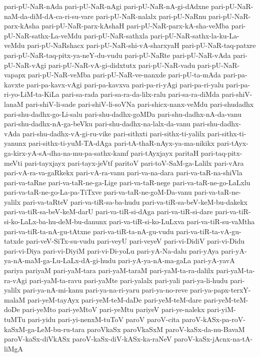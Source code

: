 {pari-pU-NaR-nAda
pari-pU-NaR-nAgi
pari-pU-NaR-nA-gi-dAdxne
pari-pU-NaR-naM-da-diM-dA-ca-ri-su-vare
pari-pU-NaR-nalalx
pari-pU-NaRnu
pari-pU-NaR-parx-kAsha
pari-pU-NaR-parx-kAshaH
pari-pU-NaR-parx-kA-sha-veMba
pari-pU-NaR-sathx-La-veMdu
pari-pU-NaR-sathxla
pari-pU-NaR-sathx-la-ku-La-veMdu
pari-pU-NaRshacx
pari-pU-NaR-shi-vA-sharxyaH
pari-pU-NaR-taq-patxre
pari-pU-NaR-taq-pitx-ya-neY-du-vudu
pari-pU-NaRte
pari-pU-NaR-vAda
pari-pU-NaR-vAgi
pari-pU-NaR-vA-gi-didxtutx
pari-pU-NaR-vadu
pari-pU-NaR-vapapx
pari-pU-NaR-veMba
pari-pU-NaR-ve-nanxde
pari-pU-ta-mAda
pari-pa-kavxte
pari-pa-kavx-vAgi
pari-pa-kavxva
pari-pa-ri-yAgi
pari-pa-ri-yalu
pari-pa-ri-yo-LiM-ta-KiLa
pari-sa-rada
pari-sa-ra-da-lilx-ralu
pari-sa-ra-diMda
pari-shiV-lanaM
pari-shiV-li-sade
pari-shiV-li-soVNa
pari-shicx-nanx-veMdu
pari-shudadhx
pari-shu-dadhx-go-Li-salu
pari-shu-dadhx-goMDa
pari-shu-dadhx-nA-da-vanu
pari-shu-dadhx-nA-ga-beVku
pari-shu-dadhx-na-lalx-da-vanu
pari-shu-dadhx-vAda
pari-shu-dadhx-vA-gi-ru-vike
pari-sithxti
pari-sithx-ti-yalilx
pari-sithx-ti-yanunx
pari-sithx-ti-yuM-TA-dAga
pari-tA-thaR-nAyx-ya-ma-nikikx
pari-tAyx-ga-kirx-yA-sA-dha-na-mu-pa-sathx-kamf
pari-tAyxjayx
paritaH
pari-taq-pitx-meVti
pari-tayxjayx
pari-tayx-jeVtf
paritoV
pari-toV-SaM-ga-Lalilx
pari-vAra
pari-vA-ra-va-gaRkekx
pari-vA-ra-vanu
pari-va-na-dara
pari-va-taR-na-shiVla
pari-va-taRne
pari-va-taR-ne-ga-Lige
pari-va-taR-nege
pari-va-taR-ne-go-LaLxlu
pari-va-taR-ne-go-La-pa-TiTxve
pari-va-taR-ne-goM-Da-vanu
pari-va-taR-ne-yalilx
pari-va-taRteV
pari-va-tiR-sa-ba-hudu
pari-va-tiR-sa-beV-keM-bu-dakekx
pari-va-tiR-sa-beV-keM-darU
pari-va-tiR-si-dAga
pari-va-tiR-si-dare
pari-va-tiR-si-ko-LaLx-ba-hu-deM-bu-danunx
pari-va-tiR-si-ko-LuLxva
pari-va-tiR-su-vaMtha
pari-va-tiR-ta-nA-gu-tAtxne
pari-va-tiR-ta-nA-gu-vudu
pari-va-tiR-ta-vA-gu-tatxde
pari-veV-SiTx-su-vudu
pari-veyU
pari-veyeV
pari-vi-DidiV
pari-vi-Didu
pari-vi-Diya
pari-vi-DiyiM
pari-vi-Di-yoLu
pari-yA-Na-dalu
pari-yAya
pari-yA-ya-nA-maM-ga-Lu-LaLx-dA-gi-hudu
pari-yA-ya-nA-ma-gaLa
pari-yA-yavA
pariya
pariyaM
pari-yaM-tara
pari-yaM-taraM
pari-yaM-ta-ra-dalilx
pari-yaM-ta-ra-vAgi
pari-yaM-ta-ravu
pari-yaMte
pari-yalalx
pari-yali
pari-ya-li-hudu
pari-yalilx
pari-ya-nA-mi-kanu
pari-ya-na-ri-yaru
pari-ya-no-reve
pari-ya-papx-terxY-malaM
pari-yeM-tayAyx
pari-yeM-teM-daDe
pari-yeM-teM-dare
pari-yeM-teM-doDe
pari-yeMto
pari-yeMtoV
pari-yeMtu
pariyeV
pari-ye-nalekx
pari-yiM-tuMTu
pari-yidu
pari-yi-nenxM-tuToV
paroV
paroV-cita
paroV-kASx-pa-roV-kaSxM-ga-LeM-bu-ru-tara
paroVkaSx
paroVkaSxM
paroV-kaSx-da-nu-BavaM
paroV-kaSx-diVkASx
paroV-kaSx-diV-kASx-ka-raNeV
paroV-kaSx-jAcnx-na-tA-liMgA
}
